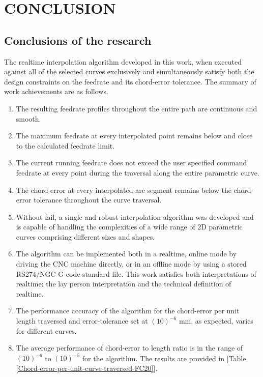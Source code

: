 \chapter{CONCLUSION}

\section{Conclusions of the research}

The realtime interpolation algorithm developed in this work, when executed against all of the selected curves exclusively and simultaneously satisfy both the design constraints on the feedrate and its chord-error tolerance. The summary of work achievements are as follows.

\begin{enumerate}
	\item The resulting feedrate profiles throughout the entire path are continuous and smooth. 
	
	\item The maximum feedrate at every interpolated point remains below and close to the calculated feedrate limit. 
	
	\item The current running feedrate does not exceed the user specified command feedrate at every point during the traversal along the entire parametric curve. 
	
	\item The chord-error at every interpolated arc segment remains below the chord-error tolerance throughout the curve traversal. 
	
	\item Without fail, a single and robust interpolation algorithm was developed and is capable of handling the complexities of a wide range of 2D parametric curves comprising different sizes and shapes. 
	
	\item The algorithm can be implemented both in a realtime, online mode by driving the CNC machine directly, or in an offline mode by using a stored RS274/NGC G-code standard file. This work satisfies both interpretations of realtime: the lay person interpretation and the technical definition of realtime. 
	
	\item The performance accuracy of the algorithm for the chord-error per unit length traversed and error-tolerance set at $(10)^{-6}$ mm, as expected, varies for different curves. 
	
	\item The average performance of chord-error to length ratio is in the range of $(10)^{-6}$ to $(10)^{-5}$ for the algorithm. The results are provided in [Table \ref{Chord-error-per-unit-curve-traversed-FC20}]. 

\end{enumerate}	

